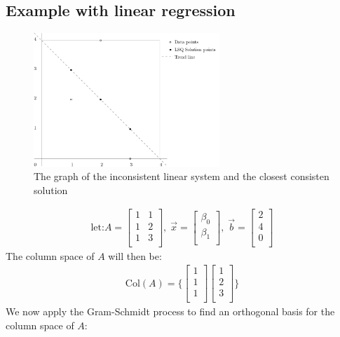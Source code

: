 \documentclass[11pt, a4paper]{article}
\begin{document}
\subsection{Example with linear regression}
\setcounter{equation}{0}
\begin{figure}[H]
  \centerline{\includegraphics[width=70mm]{images/Linear_regression.png}}
  \caption{The graph of the inconsistent linear system and the closest consisten solution}
\end{figure}
\begin{gather}
  \text{let:} A =
  \begin{bmatrix}
    1 & 1\\
    1 & 2\\
    1 & 3\\
  \end{bmatrix},\;
  \vec{x} = \begin{bmatrix} \beta_0 \\ \beta_1 \\ \end{bmatrix},\;
  \vec{b} = \begin{bmatrix} 2\\ 4\\ 0\\ \end{bmatrix}
\end{gather}
The column space of $A$ will then be:
\begin{gather}
  \text{Col}(A) = \Bigg\{ \begin{bmatrix} 1\\ 1\\ 1\\ \end{bmatrix}
                  \begin{bmatrix} 1\\ 2\\ 3\\ \end{bmatrix} \Bigg\}
\end{gather}
We now apply the Gram-Schmidt process to find an orthogonal basis for the column space of $A$:
\end{document}
